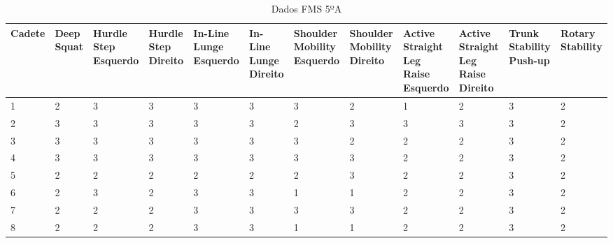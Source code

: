 \begin{landscape}
    
    \begin{table}[h]
        \centering
        \caption{Dados FMS 5ºA}
        \label{tab:fms5A}
        \renewcommand{\arraystretch}{1.3}  %
        \begin{adjustbox}{scale=0.9}
        \begin{tabular}{|p{1.8cm}|p{1.6cm}|p{1.6cm}|p{1.6cm}|p{1.6cm}|p{1.6cm}|p{1.6cm}|p{1.6cm}|p{1.6cm}|p{1.6cm}|p{1.6cm}|p{1.6cm}|}
            \hline
            \textbf{Cadete} & \textbf{Deep Squat} & \textbf{Hurdle Step Esquerdo} & \textbf{Hurdle Step Direito} & \textbf{In-Line Lunge Esquerdo} & \textbf{In-Line Lunge Direito} & \textbf{Shoulder Mobility Esquerdo} & \textbf{Shoulder Mobility Direito} & \textbf{Active Straight Leg Raise Esquerdo} & \textbf{Active Straight Leg Raise Direito} & \textbf{Trunk Stability Push-up} & \textbf{Rotary Stability} \\
            \hline
            1 & 2 & 3 & 3 & 3 & 3 & 3 & 2 & 1 & 2 & 3 & 2 \\
            2 & 3 & 3 & 3 & 3 & 3 & 2 & 3 & 3 & 3 & 3 & 2 \\
            3 & 3 & 3 & 3 & 3 & 3 & 3 & 2 & 2 & 2 & 3 & 2 \\
            4 & 3 & 3 & 3 & 3 & 3 & 3 & 3 & 2 & 2 & 3 & 2 \\
            5 & 2 & 2 & 2 & 2 & 2 & 2 & 3 & 2 & 2 & 3 & 2 \\
            6 & 2 & 3 & 2 & 3 & 3 & 1 & 1 & 2 & 2 & 3 & 2 \\
            7 & 2 & 2 & 2 & 3 & 3 & 3 & 3 & 2 & 2 & 3 & 2 \\
            8 & 2 & 2 & 2 & 3 & 3 & 1 & 1 & 2 & 2 & 3 & 2 \\
            \hline
        \end{tabular}
        \end{adjustbox}
    \end{table}
    

\end{landscape}

